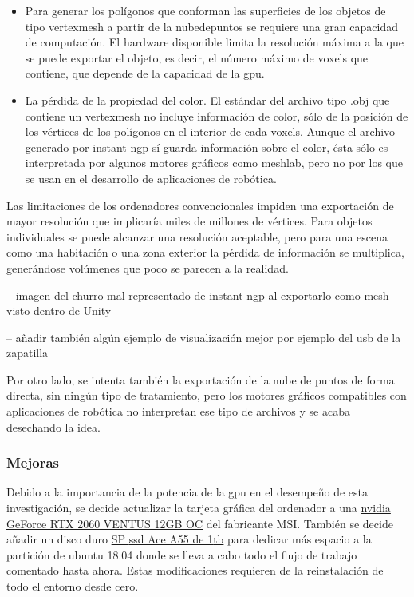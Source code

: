 \documentclass[a4paper, 12pt, spanish, twoside]{article}
\begin{document}
\begin{itemize} 

\item Para generar los polígonos que conforman las superficies de los objetos de tipo \gls{vertexmesh} a partir de la \gls{nubedepuntos} se requiere una gran capacidad de computación. El \gls{hardware} disponible limita la resolución máxima a la que se puede exportar el objeto, es decir, el número máximo de \glspl{voxel} que contiene, que depende de la capacidad de la \acrshort{gpu}. 
\item La pérdida de la propiedad del color. El estándar del archivo tipo .obj que contiene un \gls{vertexmesh} no incluye información de color, sólo de la posición de los vértices de los polígonos en el interior de cada \glspl{voxel}. Aunque el archivo generado por \gls{instant-ngp} sí guarda información sobre el color, ésta sólo es interpretada por algunos motores gráficos como \gls{meshlab}, pero no por los que se usan en el desarrollo de aplicaciones de robótica. 

\end{itemize} 

Las limitaciones de los ordenadores convencionales impiden una exportación de mayor resolución que implicaría miles de millones de vértices. Para objetos individuales se puede alcanzar una resolución aceptable, pero para una escena como una habitación o una zona exterior la pérdida de información se multiplica, generándose volúmenes que poco se parecen a la realidad. 

-- imagen del churro mal representado de instant-ngp al exportarlo como mesh visto dentro de Unity  

-- añadir también algún ejemplo de visualización mejor por ejemplo del usb de la zapatilla 

Por otro lado, se intenta también la exportación de la nube de puntos de forma directa, sin ningún tipo de tratamiento, pero los motores gráficos compatibles con aplicaciones de robótica no interpretan ese tipo de archivos y se acaba desechando la idea. 

\subsubsection{Mejoras} \label{sec:implementacion:instant-ngp:mejoras}

Debido a la importancia de la potencia de la \acrshort{gpu} en el desempeño de esta investigación, se decide actualizar la tarjeta gráfica del ordenador a una \href{https://es.msi.com/Graphics-Card/GeForce-RTX-2060-VENTUS-12G-OC}{\gls{nvidia} GeForce RTX 2060 VENTUS 12GB OC} del fabricante MSI. También se decide añadir un disco duro \href{https://www.silicon-power.com/web/es/product-Ace_A55}{SP \acrshort{ssd} Ace A55 de 1\acrshort{tb}} para dedicar más espacio a la partición de \gls{ubuntu} 18.04 donde se lleva a cabo todo el flujo de trabajo comentado hasta ahora. Estas modificaciones requieren de la reinstalación de todo el entorno desde cero. 
\end{document}
